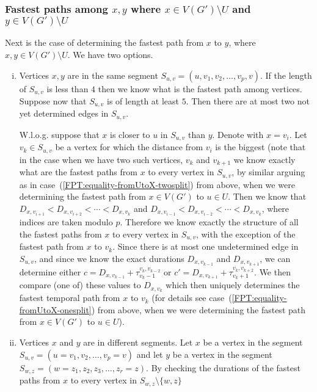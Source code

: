 \documentclass[11pt,a4paper]{article}
\theoremstyle{remark}
\theoremstyle{definition}
\begin{document}
\subsubsection*{\boldmath Fastest paths among $x,y$ where $x \in V(G') \setminus U$ and $y \in V(G') \setminus U$}
Next is the case of determining the fastest path from $x$ to $y$, where $x,y \in V(G') \setminus U$.
We have two options.
\begin{enumerate}[(i)]
    \item Vertices $x,y$ are in the same segment $S_{u,v} = (u,v_1,v_2, \dots, v_p, v)$. 
    If the length of $S_{u,v}$ is less than $4$ then we know what is the fastest path among vertices.
    Suppose now that $S_{u,v}$ is of length at least $5$. Then there are at most two not yet determined edges in $S_{u,v}$.
    
    W.l.o.g. suppose that $x$ is closer to $u$ in $S_{u,v}$ than $y$.
    Denote with $x = v_i$.
    Let $v_k \in S_{u,v}$ be a vertex for which the distance from $v_i$ is the biggest 
    (note that in the case when we have two such vertices, $v_k$ and $v_{k+1}$ we know exactly what are the fastest paths from $x$ to every vertex in $S_{u,v}$,
    by similar arguing as in case~(\ref{FPT:equality-fromUtoX-twosplit}) from above, when we were determining the fastest path from $x \in V(G')$ to $u \in U$.
    Then we know that $D_{x,v_{i+1}} < D_{x,v_{i+2}} < \cdots  < D_{x,v_{k}}$ and $D_{x,v_{i-1}} < D_{x,v_{i-2}} < \cdots  < D_{x,v_{k}}$, where indices are taken modulo $p$.
    Therefore we know exactly the structure of all the fastest paths from $x$ to every vertex in $S_{u,v}$,
    with the exception of the fastest path from $x$ to $v_k$.
    Since there is at most one undetermined edge in $S_{u,v}$,
    and since we know the exact durations $D_{x,v_{k-1}}$ and $D_{x,v_{k+1}}$,
    we can determine either
    $c = D_{x,v_{k-1}} + \tau _ {v_k-1}^{v_k,v_{k-2}}$ or 
    $c' = D_{x,v_{k+1}} + \tau _ {v_k+1}^{v_k,v_{k+2}}$.
    We then compare (one of) these values to $D_{x,v_k}$ which then 
    uniquely determines the fastest temporal path from $x$ to $v_k$
    (for details see case~(\ref{FPT:equality-fromUtoX-onesplit}) from above, when we were determining the fastest path from $x \in V(G')$ to $u \in U$).
    \item Vertices $x$ and $y$ are in different segments. 
Let $x$ be a vertex in the segment $S_{u,v} = (u=v_1,v_2, \dots, v_p = v)$ and let $y$ be a vertex in the segment $S_{w,z} = (w=z_1, z_2,z_3, \dots, z_r = z)$.
By checking the durations of the fastest paths from $x$ to every vertex in $S_{w,z} \setminus \{w,z\}$

\end{enumerate}
\end{document}

